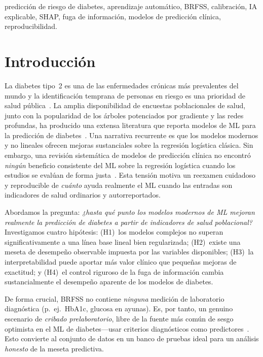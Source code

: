 \documentclass[conference]{IEEEtran}
\begin{document}
\begin{IEEEkeywords}
predicción de riesgo de diabetes, aprendizaje automático, BRFSS, calibración, IA
explicable, SHAP, fuga de información, modelos de predicción clínica, reproducibilidad.
\end{IEEEkeywords}

\section{Introducción}
La diabetes tipo~2 es una de las enfermedades crónicas más prevalentes del mundo y la
identificación temprana de personas en riesgo es una prioridad de salud
pública~\cite{idf2021atlas,ada2021classification}. La amplia disponibilidad de encuestas
poblacionales de salud, junto con la popularidad de los árboles potenciados por gradiente
y las redes profundas, ha producido una extensa literatura que reporta modelos de ML
para la predicción de
diabetes~\cite{xie2019building,dinh2019data,tigga2020prediction,rashid2020diabetes}. Una
narrativa recurrente es que los modelos modernos y no lineales ofrecen mejoras
sustanciales sobre la regresión logística clásica. Sin embargo, una revisión sistemática de
modelos de predicción clínica no encontró \emph{ningún} beneficio consistente del ML sobre
la regresión logística cuando los estudios se evalúan de forma
justa~\cite{christodoulou2019systematic}. Esta tensión motiva un reexamen cuidadoso y
reproducible de \emph{cuánto} ayuda realmente el ML cuando las entradas son indicadores de
salud ordinarios y autorreportados.

Abordamos la pregunta: \emph{¿hasta qué punto los modelos modernos de ML mejoran realmente
la predicción de diabetes a partir de indicadores de salud poblacional?} Investigamos
cuatro hipótesis: (H1)~los modelos complejos no superan significativamente a una línea base
lineal bien regularizada; (H2)~existe una meseta de desempeño observable impuesta por las
variables disponibles; (H3)~la interpretabilidad puede aportar más valor clínico que
pequeñas mejoras de exactitud; y (H4)~el control riguroso de la fuga de información cambia
sustancialmente el desempeño aparente de los modelos de diabetes.

De forma crucial, BRFSS no contiene \emph{ninguna} medición de laboratorio diagnóstica
(p.\ ej.\ HbA1c, glucosa en ayunas). Es, por tanto, un genuino escenario de \emph{cribado
prelaboratorio}, libre de la fuente más común de sesgo optimista en el ML de
diabetes---usar criterios diagnósticos como
predictores~\cite{kaufman2012leakage,kapoor2023leakage}. Esto convierte al conjunto de
datos en un banco de pruebas ideal para un análisis \emph{honesto} de la meseta predictiva.
\end{document}
